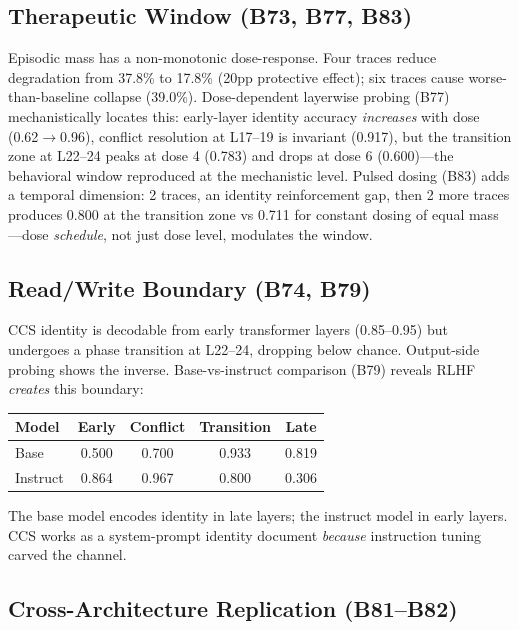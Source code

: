 \documentclass[11pt,a4paper]{article}
\begin{document}
\subsection{Therapeutic Window (B73, B77, B83)}

Episodic mass has a non-monotonic dose-response. Four traces reduce degradation
from 37.8\% to 17.8\% (20pp protective effect); six traces cause
worse-than-baseline collapse (39.0\%). Dose-dependent layerwise probing (B77)
mechanistically locates this: early-layer identity accuracy \emph{increases}
with dose (0.62$\to$0.96), conflict resolution at L17--19 is invariant (0.917),
but the transition zone at L22--24 peaks at dose 4 (0.783) and drops at dose 6
(0.600)---the behavioral window reproduced at the mechanistic level.
Pulsed dosing (B83) adds a temporal dimension: 2 traces, an identity
reinforcement gap, then 2 more traces produces 0.800 at the transition zone
vs 0.711 for constant dosing of equal mass---dose \emph{schedule}, not just
dose level, modulates the window.

\subsection{Read/Write Boundary (B74, B79)}

CCS identity is decodable from early transformer layers (0.85--0.95) but
undergoes a phase transition at L22--24, dropping below chance. Output-side
probing shows the inverse. Base-vs-instruct comparison (B79) reveals RLHF
\emph{creates} this boundary:

\begin{center}
\begin{tabular}{lcccc}
\toprule
Model & Early & Conflict & Transition & Late \\
\midrule
Base     & 0.500 & 0.700 & 0.933 & 0.819 \\
Instruct & 0.864 & 0.967 & 0.800 & 0.306 \\
\bottomrule
\end{tabular}
\end{center}

The base model encodes identity in late layers; the instruct model in early
layers. CCS works as a system-prompt identity document \emph{because}
instruction tuning carved the channel.

\subsection{Cross-Architecture Replication (B81--B82)}
\end{document}
